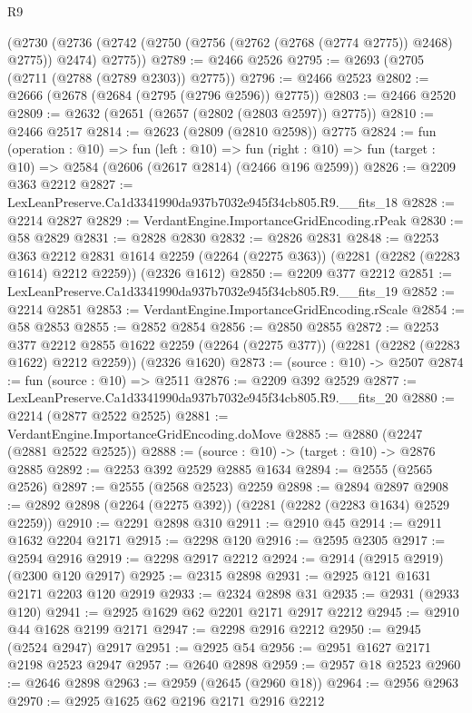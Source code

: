 \begin{lexlean}{R9}
\begin{coremodule}
    (@2730 (@2736 (@2742 (@2750 (@2756 (@2762 (@2768 (@2774 @2775)) @2468) @2775)) @2474) @2775))
@2789 := @2466 @2526
@2795 := @2693 (@2705 (@2711 (@2788 (@2789 @2303)) @2775))
@2796 := @2466 @2523
@2802 := @2666 (@2678 (@2684 (@2795 (@2796 @2596)) @2775))
@2803 := @2466 @2520
@2809 := @2632 (@2651 (@2657 (@2802 (@2803 @2597)) @2775))
@2810 := @2466 @2517
@2814 := @2623 (@2809 (@2810 @2598)) @2775
@2824 := fun (operation : @10) =>
  fun (left : @10) =>
  fun (right : @10) => fun (target : @10) => @2584 (@2606 (@2617 @2814) (@2466 @196 @2599))
@2826 := @2209 @363 @2212
@2827 := LexLeanPreserve.Ca1d3341990da937b7032e945f34cb805.R9.__fits_18
@2828 := @2214 @2827
@2829 := VerdantEngine.ImportanceGridEncoding.rPeak
@2830 := @58 @2829
@2831 := @2828 @2830
@2832 := @2826 @2831
@2848 := @2253
    @363
    @2212
    @2831
    @1614
    @2259
    (@2264 (@2275 @363))
    (@2281 (@2282 (@2283 @1614) @2212 @2259))
    (@2326 @1612)
@2850 := @2209 @377 @2212
@2851 := LexLeanPreserve.Ca1d3341990da937b7032e945f34cb805.R9.__fits_19
@2852 := @2214 @2851
@2853 := VerdantEngine.ImportanceGridEncoding.rScale
@2854 := @58 @2853
@2855 := @2852 @2854
@2856 := @2850 @2855
@2872 := @2253
    @377
    @2212
    @2855
    @1622
    @2259
    (@2264 (@2275 @377))
    (@2281 (@2282 (@2283 @1622) @2212 @2259))
    (@2326 @1620)
@2873 := (source : @10) -> @2507
@2874 := fun (source : @10) => @2511
@2876 := @2209 @392 @2529
@2877 := LexLeanPreserve.Ca1d3341990da937b7032e945f34cb805.R9.__fits_20
@2880 := @2214 (@2877 @2522 @2525)
@2881 := VerdantEngine.ImportanceGridEncoding.doMove
@2885 := @2880 (@2247 (@2881 @2522 @2525))
@2888 := (source : @10) -> (target : @10) -> @2876 @2885
@2892 := @2253 @392 @2529 @2885 @1634
@2894 := @2555 (@2565 @2526)
@2897 := @2555 (@2568 @2523) @2259
@2898 := @2894 @2897
@2908 := @2892 @2898 (@2264 (@2275 @392)) (@2281 (@2282 (@2283 @1634) @2529 @2259))
@2910 := @2291 @2898 @310
@2911 := @2910 @45
@2914 := @2911 @1632 @2204 @2171
@2915 := @2298 @120
@2916 := @2595 @2305
@2917 := @2594 @2916
@2919 := @2298 @2917 @2212
@2924 := @2914 (@2915 @2919) (@2300 @120 @2917)
@2925 := @2315 @2898
@2931 := @2925 @121 @1631 @2171 @2203 @120 @2919
@2933 := @2324 @2898 @31
@2935 := @2931 (@2933 @120)
@2941 := @2925 @1629 @62 @2201 @2171 @2917 @2212
@2945 := @2910 @44 @1628 @2199 @2171
@2947 := @2298 @2916 @2212
@2950 := @2945 (@2524 @2947) @2917
@2951 := @2925 @54
@2956 := @2951 @1627 @2171 @2198 @2523 @2947
@2957 := @2640 @2898
@2959 := @2957 @18 @2523
@2960 := @2646 @2898
@2963 := @2959 (@2645 (@2960 @18))
@2964 := @2956 @2963
@2970 := @2925 @1625 @62 @2196 @2171 @2916 @2212

\end{coremodule}
\end{lexlean}
